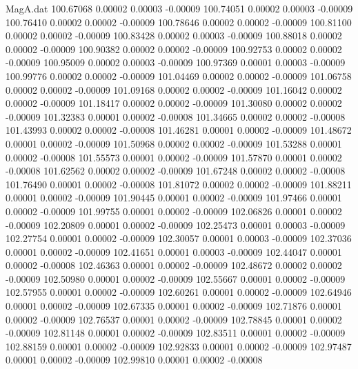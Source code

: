 \begin{filecontents}{MagA.dat}
 100.67068    0.00002    0.00003   -0.00009
 100.74051    0.00002    0.00003   -0.00009
 100.76410    0.00002    0.00002   -0.00009
 100.78646    0.00002    0.00002   -0.00009
 100.81100    0.00002    0.00002   -0.00009
 100.83428    0.00002    0.00003   -0.00009
 100.88018    0.00002    0.00002   -0.00009
 100.90382    0.00002    0.00002   -0.00009
 100.92753    0.00002    0.00002   -0.00009
 100.95009    0.00002    0.00003   -0.00009
 100.97369    0.00001    0.00003   -0.00009
 100.99776    0.00002    0.00002   -0.00009
 101.04469    0.00002    0.00002   -0.00009
 101.06758    0.00002    0.00002   -0.00009
 101.09168    0.00002    0.00002   -0.00009
 101.16042    0.00002    0.00002   -0.00009
 101.18417    0.00002    0.00002   -0.00009
 101.30080    0.00002    0.00002   -0.00009
 101.32383    0.00001    0.00002   -0.00008
 101.34665    0.00002    0.00002   -0.00008
 101.43993    0.00002    0.00002   -0.00008
 101.46281    0.00001    0.00002   -0.00009
 101.48672    0.00001    0.00002   -0.00009
 101.50968    0.00002    0.00002   -0.00009
 101.53288    0.00001    0.00002   -0.00008
 101.55573    0.00001    0.00002   -0.00009
 101.57870    0.00001    0.00002   -0.00008
 101.62562    0.00002    0.00002   -0.00009
 101.67248    0.00002    0.00002   -0.00008
 101.76490    0.00001    0.00002   -0.00008
 101.81072    0.00002    0.00002   -0.00009
 101.88211    0.00001    0.00002   -0.00009
 101.90445    0.00001    0.00002   -0.00009
 101.97466    0.00001    0.00002   -0.00009
 101.99755    0.00001    0.00002   -0.00009
 102.06826    0.00001    0.00002   -0.00009
 102.20809    0.00001    0.00002   -0.00009
 102.25473    0.00001    0.00003   -0.00009
 102.27754    0.00001    0.00002   -0.00009
 102.30057    0.00001    0.00003   -0.00009
 102.37036    0.00001    0.00002   -0.00009
 102.41651    0.00001    0.00003   -0.00009
 102.44047    0.00001    0.00002   -0.00008
 102.46363    0.00001    0.00002   -0.00009
 102.48672    0.00002    0.00002   -0.00009
 102.50980    0.00001    0.00002   -0.00009
 102.55667    0.00001    0.00002   -0.00009
 102.57955    0.00001    0.00002   -0.00009
 102.60261    0.00001    0.00002   -0.00009
 102.64946    0.00001    0.00002   -0.00009
 102.67335    0.00001    0.00002   -0.00009
 102.71876    0.00001    0.00002   -0.00009
 102.76537    0.00001    0.00002   -0.00009
 102.78845    0.00001    0.00002   -0.00009
 102.81148    0.00001    0.00002   -0.00009
 102.83511    0.00001    0.00002   -0.00009
 102.88159    0.00001    0.00002   -0.00009
 102.92833    0.00001    0.00002   -0.00009
 102.97487    0.00001    0.00002   -0.00009
 102.99810    0.00001    0.00002   -0.00008

\end{filecontents}
